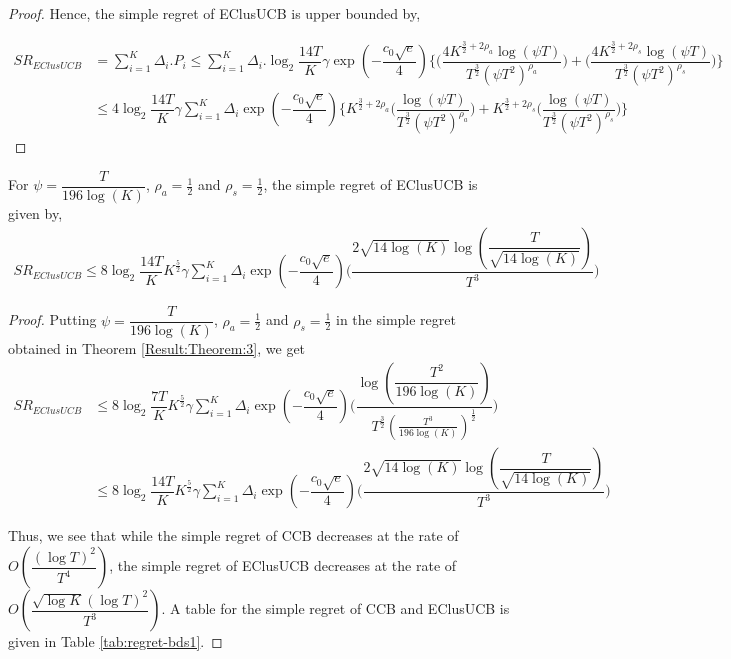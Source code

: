 \begin{proof}
Hence, the simple regret of EClusUCB is upper bounded by,

\begin{align*}
SR_{EClusUCB} &= \sum_{i=1}^{K} \Delta_{i}. P_{i} \leq \sum_{i=1}^{K} \Delta_{i}. \log_{2}\dfrac{14 T}{K}\gamma \exp(-\dfrac{c_{0}\sqrt{e}}{4})\bigg\lbrace\bigg(\dfrac{4K^{\frac{3}{2} +2\rho_{a}}\log (\psi T )}{T^{\frac{3}{2}}(\psi T^2)^{\rho_{a}}}\bigg) + \bigg(\dfrac{4K^{\frac{3}{2} +2\rho_{s}}\log (\psi T )}{T^{\frac{3}{2}}(\psi T^2)^{\rho_{s}}}\bigg)\bigg\rbrace \\
&\leq 4\log_{2}\dfrac{14 T}{K}\gamma \sum_{i=1}^{K} \Delta_{i} \exp(-\dfrac{c_{0}\sqrt{e}}{4}) \bigg\lbrace K^{\frac{3}{2} +2\rho_{a}} \bigg(\dfrac{\log (\psi T )}{T^{\frac{3}{2}}(\psi T^2)^{\rho_{a}}}\bigg) + K^{\frac{3}{2} +2\rho_{s}} \bigg(\dfrac{\log (\psi T )}{T^{\frac{3}{2}}(\psi T^2)^{\rho_{s}}}\bigg) \bigg\rbrace
\end{align*}
\end{proof}


\begin{corollary}
\label{Result:Corollary:3}
For $\psi=\dfrac{T}{196\log (K)}$, $\rho_a=\frac{1}{2}$ and $\rho_s=\frac{1}{2}$, the simple regret of EClusUCB is given by,
\begin{align*}
SR_{EClusUCB} \leq 8 \log_{2}\dfrac{14 T}{K} K^{\frac{5}{2}} \gamma \sum_{i=1}^{K} \Delta_{i} \exp(-\dfrac{c_{0}\sqrt{e}}{4})   \bigg(\dfrac{2 \sqrt{14\log (K)} \log (\dfrac{T}{\sqrt{14\log (K)}} )}{T^{3}}\bigg)
\end{align*}
\end{corollary}

\begin{proof}
Putting $\psi=\dfrac{T}{196 \log (K)}$, $\rho_a=\frac{1}{2}$ and $\rho_s=\frac{1}{2}$ in the simple regret obtained in Theorem \ref{Result:Theorem:3}, we get
\begin{align*}
SR_{EClusUCB} &\leq 8 \log_{2}\dfrac{7T}{K} K^{\frac{5}{2}} \gamma \sum_{i=1}^{K} \Delta_{i} \exp(-\dfrac{c_{0}\sqrt{e}}{4})   \bigg(\dfrac{\log (\dfrac{T^{2}}{196 \log (K)} )}{T^{\frac{3}{2}}(\frac{T^3}{196\log (K)})^{\frac{1}{2}}}\bigg)\\
& \leq 8 \log_{2}\dfrac{14 T}{K} K^{\frac{5}{2}} \gamma  \sum_{i=1}^{K} \Delta_{i} \exp(-\dfrac{c_{0}\sqrt{e}}{4}) \bigg(\dfrac{2 \sqrt{14\log (K)} \log (\dfrac{T}{\sqrt{14\log (K)}} )}{T^{3}}\bigg)
\end{align*} 

Thus, we see that while the simple regret of CCB decreases at the rate of $O\left( \dfrac{(\log T)^2}{T^4} \right)$, the simple regret of EClusUCB decreases at the rate of $O\left( \dfrac{\sqrt{\log K}(\log T)^2}{T^3} \right)$. A table for the simple regret of CCB and EClusUCB is given in Table \ref{tab:regret-bds1}.

\end{proof}

